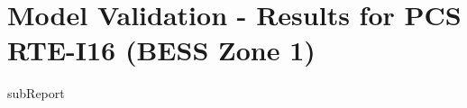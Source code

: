 




    \section{Model Validation - Results for PCS RTE-I16 (BESS Zone 1)}

    {{subReport}}
    \newpage

